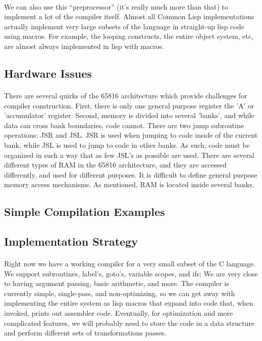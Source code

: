 \documentclass {article}
\begin{document}
\paragraph{}
We can also use this ``preprocessor'' (it's really much more than
that) to implement a lot of the compiler itself.  Almost all Common
Lisp implementations actually implement very large subsets of the
language in straight-up lisp code using macros.  For example, the
looping constructs, the entire object system, etc, are almost always
implemented in lisp with macros.

\subsection{Hardware Issues}
\paragraph{}
There are several quirks of the 65816 architecture which provide
challenges for compiler construction.  First, there is only one
general purpose register the 'A' or 'accumulator' register.  Second,
memory is divided into several 'banks', and while data can cross bank
boundaries, code cannot.  There are two jump subroutine operations:
JSR and JSL.  JSR is used when jumping to code inside of the current
bank, while JSL is used to jump to code in other banks.  As such, code
must be organized in such a way that as few JSL's as possible are
used.  There are several different types of RAM in the 65816
architecture, and they are accessed differently, and used for
different purposes.  It is difficult to define general purpose memory
access mechanisms.  As mentioned, RAM is located inside several banks.

\subsection{Simple Compilation Examples}
\subsection{Implementation Strategy}

\paragraph{}
Right now we have a working compiler for a very small subset of the C
language.  We support subroutines, label's, goto's, variable scopes,
and ifs; We are very close to having argument passing, basic
arithmetic, and more.  The compiler is currently simple, single-pass,
and non-optimizing, so we can get away with implementing the entire
system as lisp macros that expand into code that, when invoked, prints
out assembler code.  Eventually, for optimization and more complicated
features, we will probably need to store the code in a data structure
and perform different sets of transformations passes.
\end{document}
